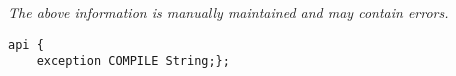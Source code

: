 \label{pkg:compilation\_exception}

{\tiny \it The above information is manually maintained and may contain errors.}
\begin{verbatim}
api {
    exception COMPILE String;};
\end{verbatim}
